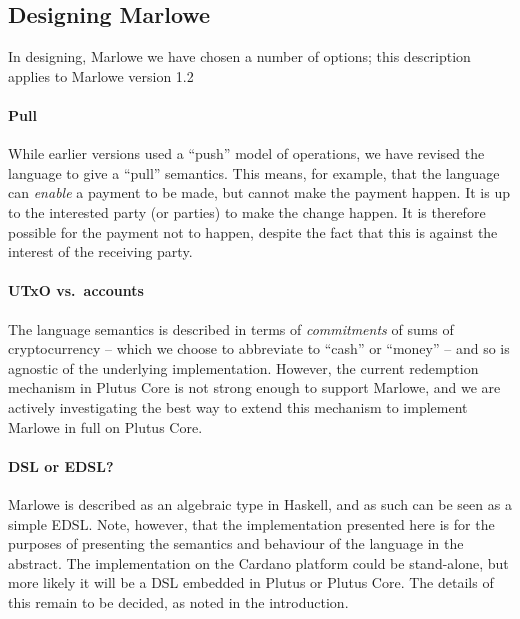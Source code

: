 \documentclass[
      acmsmall
    , screen
    , review=true
  ]{acmart}
\begin{document}
\subsection{Designing Marlowe}

In designing, Marlowe we have chosen a number of options; this description applies to Marlowe version 1.2 

\paragraph{Pull} 

While earlier versions used a ``push'' model of operations, we have revised the language to give a ``pull'' semantics. 
This means, for example, that the language can \emph{enable} a payment to be made, but cannot make the payment happen. 
It is up to the interested party (or parties) to make the change happen. It is therefore possible for the payment not to 
happen, despite the fact that this is against the interest of the receiving party.

\paragraph{UTxO vs.\ accounts} 

The language semantics is described in terms of \emph{commitments} of sums of cryptocurrency -- which we choose to 
abbreviate to ``cash'' or ``money'' -- and so is agnostic of the underlying implementation.  However, the current 
redemption mechanism in Plutus Core is not strong enough to support Marlowe, and we are actively investigating the best 
way to extend this mechanism to implement Marlowe in full on Plutus Core.

\paragraph{DSL or EDSL?}

Marlowe is described as an algebraic  type in Haskell, and as such can be seen as a simple EDSL. Note, however, that the implementation presented here is for the purposes of presenting the semantics and behaviour of the language in the abstract. The implementation on the Cardano platform could be stand-alone, but more likely it will be a DSL embedded in Plutus or Plutus Core. The details of this remain to be decided, as noted in the introduction.
\end{document}
